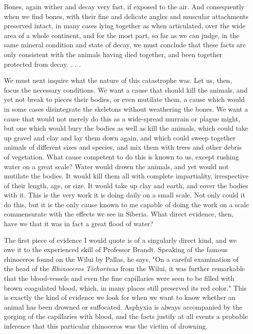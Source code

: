 Bones, again wither and decay very fast, if exposed to the air. And consequently when we
find bones, with their fine and delicate angles and muscular attachments preserved intact, in
many cases lying together as when articulated, over the wide area of a whole continent, and
for the most part, so far as we can judge, in the same mineral condition and state of decay, we
must conclude that these facts are only consistent with the animals having died together, and
been together protected from decay. . . .

We must next inquire what the nature of this catastrophe was. Let us, then, focus the
necessary conditions. We want a cause that should kill the animals, and yet not break to
pieces their bodies, or even mutilate them, a cause which would in some cases disintegrate
the skeletons without weathering the bones. We want a cause that would not merely do this
as a wide-spread murrain or plague might, but one which would bury the bodies as well as
kill the animals, which could take up gravel and clay and lay them down again, and which
could sweep together animals of different sizes and species, and mix them with trees and
other debris of vegetation. What cause competent to do this is known to us, except rushing
water on a great scale? Water would drown the animals, and yet would not mutilate the
bodies. It would kill them all with complete impartiality, irrespective of their length, age, or
size. It would take up clay and earth, and cover the bodies with it. This is the very work it is
doing daily on a small scale. Not only could it do this, but it is the only cause known to me
capable of doing the work on a scale commensurate with the effects we see in Siberia. What
direct evidence, then, have we that it was in fact a great flood of water?

The first piece of evidence I would quote is of a singularly direct kind, and we owe it to the
experienced skill of Professor Brandt. Speaking of the famous rhinoceros found on the Wilui
by Pallas, he says, "On a careful examination of the head of the \textit{Rhinoceros Tichorinus} from
the Wilui, it was further remarkable that the blood-vessels and even the fine capillaries were
seen to be filled with brown coagulated blood, which, in many places still preserved its red
color." This is exactly the kind of evidence we look for when we want to know whether an
animal has been drowned or suffocated. Asphyxia is always accompanied by the gorging of
the capillaries with blood, and the facts justify at all events a probable inference that this
particular rhinoceros was the victim of drowning.

